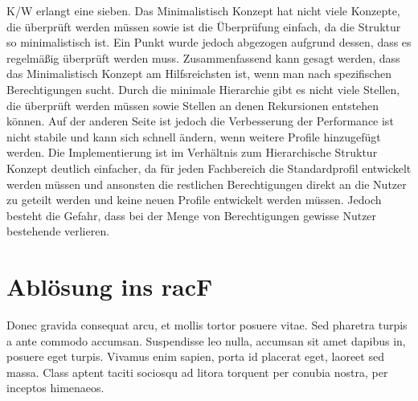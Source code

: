 \ac{K/W} erlangt eine sieben. 
Das Minimalistisch Konzept hat nicht viele Konzepte, die überprüft werden müssen sowie ist die Überprüfung einfach, da die Struktur so minimalistisch ist.
Ein Punkt wurde jedoch abgezogen aufgrund dessen, dass es regelmäßig überprüft werden muss.
\newline
\newline
Zusammenfassend kann gesagt werden, dass das Minimalistisch Konzept am Hilfsreichsten ist, wenn man nach spezifischen Berechtigungen sucht.
Durch die minimale Hierarchie gibt es nicht viele Stellen, die überprüft werden müssen sowie Stellen an denen Rekursionen entstehen können.
Auf der anderen Seite ist jedoch die Verbesserung der Performance ist nicht stabile und kann sich schnell ändern, wenn weitere Profile hinzugefügt werden.
Die Implementierung ist im Verhältnis zum Hierarchische Struktur Konzept deutlich einfacher, da für jeden Fachbereich die Standardprofil entwickelt werden müssen und ansonsten die restlichen Berechtigungen direkt an die Nutzer zu geteilt werden und keine neuen Profile entwickelt werden müssen.
Jedoch besteht die Gefahr, dass bei der Menge von Berechtigungen gewisse Nutzer bestehende verlieren.

\section{Ablösung ins racF}
\label{sec:chapter05:racF}
Donec gravida consequat arcu, et mollis tortor posuere vitae. Sed pharetra turpis a ante commodo accumsan. Suspendisse leo nulla, accumsan sit amet dapibus in, posuere eget turpis. Vivamus enim sapien, porta id placerat eget, laoreet sed massa. Class aptent taciti sociosqu ad litora torquent per conubia nostra, per inceptos himenaeos.

